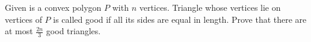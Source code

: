 Given is a convex polygon $ P$ with $ n$ vertices. Triangle whose vertices lie on vertices of $ P$ is called good  if all its sides are equal in length. Prove that there are at most $ \frac {2n}{3}$ good triangles.